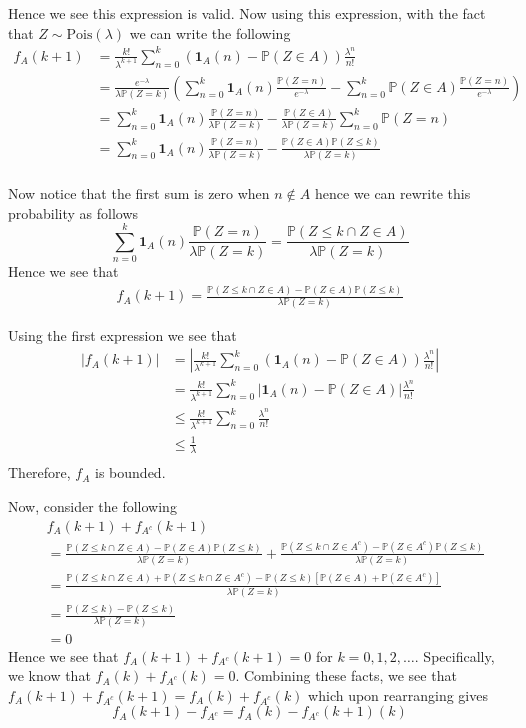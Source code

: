 \documentclass[12pt]{article}  %
\newcommand{\prob}{{\mathbb{P}}}
\newcommand{\ind}{{\mathbf{1}}}
\begin{document}
\begin{enumerate}
\begin{enumerate}
Hence we see this expression is valid. Now using this expression, with the fact that $Z\sim\text{Pois}(\lambda)$ we can write the following 
\begin{align*}
f_A(k+1) &= \frac{k!}{\lambda^{k+1}}\sum_{n=0}^{k}\left(\ind_A(n)-\prob(Z\in A)\right)\frac{\lambda^n}{n!}\\
&= \frac{e^{-\lambda}}{\lambda\prob(Z = k)}\left(\sum_{n=0}^{k}\ind_A(n)\frac{\prob(Z = n)}{e^{-\lambda}}-\sum_{n=0}^{k}\prob(Z\in A)\frac{\prob(Z = n)}{e^{-\lambda}}\right)\\
&= \sum_{n=0}^{k}\ind_A(n)\frac{\prob(Z = n)}{\lambda\prob(Z = k)}-\frac{\prob(Z \in A)}{\lambda\prob(Z=k)}\sum_{n=0}^{k}\prob(Z = n)\\
&= \sum_{n=0}^{k}\ind_A(n)\frac{\prob(Z = n)}{\lambda\prob(Z = k)}-\frac{\prob(Z \in A)\prob(Z \leq k )}{\lambda\prob(Z=k)}\\
\end{align*}

Now notice that the first sum is zero when $n\not\in A$ hence we can rewrite this probability as follows
$$\sum_{n=0}^{k}\ind_A(n)\frac{\prob(Z = n)}{\lambda\prob(Z = k)}=\frac{\prob(Z \leq k\cap Z \in A)}{\lambda\prob(Z = k)}$$ Hence we see that 
\begin{align}
f_A(k+1) = \frac{\prob(Z \leq k \cap Z \in A)-\prob(Z \in A)\prob(Z \leq k )}{\lambda\prob(Z = k)}
\end{align}

Using the first expression we see that 
\begin{align*}
|f_A(k+1)| &= \left|\frac{k!}{\lambda^{k+1}}\sum_{n=0}^{k}\left(\ind_A(n)-\prob(Z\in A)\right)\frac{\lambda^n}{n!}\right|\\
&= \frac{k!}{\lambda^{k+1}}\sum_{n=0}^{k}\left|\ind_A(n)-\prob(Z\in A)\right|\frac{\lambda^n}{n!}\\
&\leq \frac{k!}{\lambda^{k+1}}\sum_{n=0}^{k}\frac{\lambda^n}{n!}\\
&\leq \frac{1}{\lambda}\\
\end{align*}
Therefore, $f_A$ is bounded. 

Now, consider the following 
\begin{align*}
&f_A(k+1)+f_{A^c}(k+1)\\ &= \frac{\prob(Z \leq k \cap Z \in A)-\prob(Z \in A)\prob(Z \leq k )}{\lambda\prob(Z = k)} + \frac{\prob(Z \leq k \cap Z \in A^c)-\prob(Z \in A^c)\prob(Z \leq k )}{\lambda\prob(Z = k)}\\
&= \frac{\prob(Z \leq k \cap Z \in A)+ \prob(Z \leq k \cap Z \in A^c)-\prob(Z \leq k )[\prob(Z \in A) +\prob(Z \in A^c)]}{\lambda\prob(Z = k)}\\
&= \frac{\prob(Z\leq k) - \prob(Z\leq k)}{\lambda\prob(Z = k)}\\
&= 0
\end{align*}
Hence we see that $f_A(k+1)+f_{A^c}(k+1) = 0$ for $k = 0, 1, 2,\ldots$. Specifically, we know that $f_A(k)+f_{A^c}(k) = 0$. Combining these facts, we see that $f_A(k+1)+f_{A^c}(k+1) = f_A(k)+f_{A^c}(k)$ which upon rearranging gives $$f_A(k+1)-f_{A^c} = f_A(k)-f_{A^c}(k+1)(k)$$


\end{enumerate}
\end{enumerate}
\end{document}
